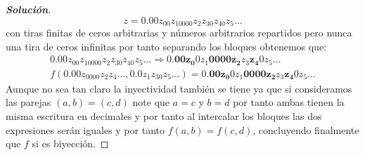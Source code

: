 \documentclass[11pt]{article}
\numberwithin{equation}{section}
\numberwithin{figure}{section}
\begin{document}
\begin{enumerate}
\begin{proof}[\textbf{Solución}]
\begin{equation*}
       z=0.00z_00z_10000z_2z_30z_40z_5\dots
   \end{equation*}
   con tiras finitas de ceros arbitrarias y números arbitrarios repartidos pero nunca una tira de ceros infinitas por tanto separando los bloques obtenemos que:
   \begin{align*}
       0.00z_00z_10000z_2z_30z_40z_5\dots\Rightarrow0.\mathbf{00z_0 }0z_1\mathbf{0000z_2 }z_3\mathbf{z_4 }0z_5\dots\\
       f(0.00z_0000z_2z_4\dots,0.0z_1z_30z_5\dots)=0.\mathbf{00z_0 }0z_1\mathbf{0000z_2 }z_3\mathbf{z_4 }0z_5\dots
   \end{align*}
  Aunque no sea tan claro la inyectividad también se tiene ya que si consideramos las parejas $(a,b)=(c,d)$ note que $a=c$ y $b=d$ por tanto ambas tienen la misma escritura en decimales y por tanto al intercalar los bloques las dos expresiones serán iguales y por tanto $f(a,b)=f(c,d)$, concluyendo finalmente que $f$ si es biyección.
   \end{proof}
\end{enumerate}
\end{document}
